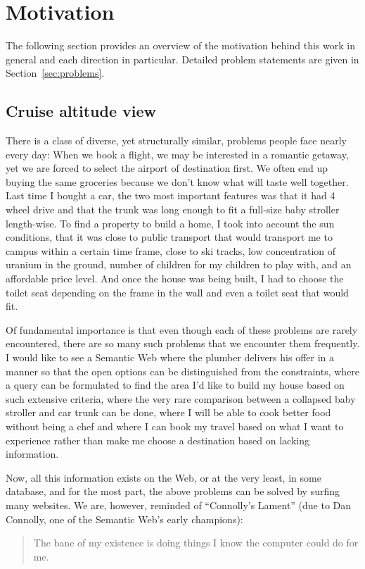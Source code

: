 \section{Motivation}\label{sec:motivation}

The following section provides an overview of the motivation behind
this work in general and each direction in particular. Detailed
problem statements are given in Section~\ref{sec:problems}.

\subsection{Cruise altitude view}

There is a class of diverse, yet structurally similar, problems people
face nearly every day: When we book a flight, we may be interested in
a romantic getaway, yet we are forced to select the airport of
destination first. We often end up buying the same groceries because
we don't know what will taste well together. Last time I bought a car,
the two most important features was that it had 4 wheel drive and that
the trunk was long enough to fit a full-size baby stroller
length-wise. To find a property to build a home, I took into account
the sun conditions, that it was close to public transport that would
transport me to campus within a certain time frame, close to
ski tracks, low concentration of uranium in the ground, number of children for
my children to play with, and an affordable price level. And once the
house was being built, I had to choose the toilet seat depending on
the frame in the wall and even a toilet seat that would fit.

Of fundamental importance is that even though each of these
problems are rarely encountered, there are so many such problems that
we encounter them frequently. I would like to see a Semantic Web
where the plumber delivers his offer in a manner so that the open
options can be distinguished from the constraints, where a query can
be formulated to find the area I'd like to build my house based on
such extensive criteria, where the very rare comparison between a
collapsed baby stroller and car trunk can be done, where I will be
able to cook better food without being a chef and where I can book my
travel based on what I want to experience rather than make me choose a
destination based on lacking information.

Now, all this information exists on the Web, or at the very least, in
some database, and for the most part, the above problems can be
solved by surfing many websites. We are, however, reminded of ``Connolly's
Lament'' (due to Dan Connolly, one of the Semantic Web's early champions):
\begin{quote}
 The bane of my existence is doing things I know the computer could do
 for me.
\end{quote}

